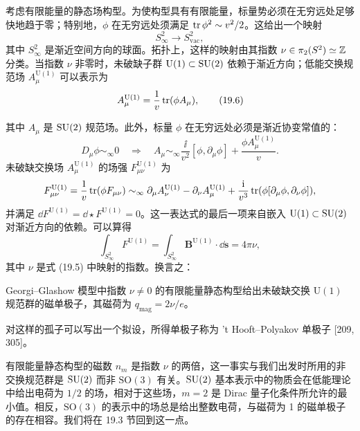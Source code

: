 考虑有限能量的静态场构型。为使构型具有有限能量，标量势必须在无穷远处足够快地趋于零；特别地，$\phi$ 在无穷远处须满足 $\operatorname{tr}\phi^2\sim v^2/2$。这给出一个映射
\begin{equation}
S^2_\infty\longrightarrow S^2_{\mathrm{vac}}, \tag{19.5}
\end{equation}
其中 $S^2_\infty$ 是渐近空间方向的球面。拓扑上，这样的映射由其指数 $\nu\in\pi_2(S^2)\simeq\mathbb{Z}$ 分类。当指数 $\nu$ 非零时，未破缺子群 $\mathrm{U}(1)\subset\operatorname{SU}(2)$ 依赖于渐近方向；低能交换规范场 $A^{\mathrm{U}(1)}_\mu$ 可以表示为
\begin{equation}
A^{\mathrm{U}(1)}_\mu=\frac{1}{v}\operatorname{tr}(\phi A_\mu), \tag{19.6}
\end{equation}


其中 $A_\mu$ 是 $\operatorname{SU}(2)$ 规范场。此外，标量 $\phi$ 在无穷远处必须是渐近协变常值的：
\[
D_\mu\phi\sim_\infty 0
\quad\Longrightarrow\quad
A_\mu\sim_\infty \frac{\ii}{v^2}[\phi,\partial_\mu\phi]+\frac{\phi A^{\mathrm{U}(1)}_\mu}{v}.
\]
未破缺交换场 $A^{\mathrm{U}(1)}_\mu$ 的场强 $F^{\mathrm{U}(1)}_{\mu\nu}$ 为
\[
F^{\mathrm{U}(1)}_{\mu\nu}
=\frac{1}{v}\operatorname{tr}(\phi F_{\mu\nu})
\sim_\infty \partial_\mu A^{\mathrm{U}(1)}_\nu-\partial_\nu A^{\mathrm{U}(1)}_\mu
+\frac{\mathrm{i}}{v^3}\operatorname{tr}(\phi[\partial_\mu\phi,\partial_\nu\phi]),
\]
并满足 $\dd F^{\mathrm{U}(1)}=\dd\star F^{\mathrm{U}(1)}=0$。这一表达式的最后一项来自嵌入 $\mathrm{U}(1)\subset\operatorname{SU}(2)$ 对渐近方向的依赖。可以算得
\[
\int_{S^2_\infty}F^{\mathrm{U}(1)}
=\int_{S^2_\infty}\mathbf{B}^{\mathrm{U}(1)}\cdot \dd\mathbf{s}=4\pi\nu,
\]
其中 $\nu$ 是式 (19.5) 中映射的指数。换言之：

\begin{proposition}[19.8]
Georgi--Glashow 模型中指数 $\nu\ne 0$ 的有限能量静态构型给出未破缺交换 $\mathrm{U}(1)$ 规范群的磁单极子，其磁荷为 $q_{\mathrm{mag}}=2\nu/e$。
\end{proposition}

对这样的孤子可以写出一个拟设，所得单极子称为 't Hooft--Polyakov 单极子 [209, 305]。

\begin{remark}[19.9]
有限能量静态构型的磁数 $n_m$ 是指数 $\nu$ 的两倍，这一事实与我们出发时所用的非交换规范群是 $\operatorname{SU}(2)$ 而非 $\mathrm{SO}(3)$ 有关。$\operatorname{SU}(2)$ 基本表示中的物质会在低能理论中给出电荷为 $1/2$ 的场，相对于这些场，$m=2$ 是 Dirac 量子化条件所允许的最小值。相反，$\mathrm{SO}(3)$ 的表示中的场总是给出整数电荷，与磁荷为 1 的磁单极子的存在相容。我们将在 19.3 节回到这一点。
\end{remark}

